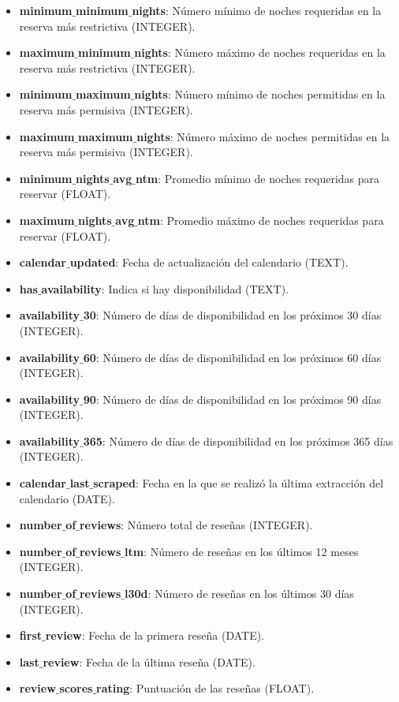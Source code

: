 \begin{itemize}[topsep=0pt, partopsep=0pt, itemsep=0pt, parsep=0pt]
\item \textbf{minimum$\_$minimum$\_$nights}: Número mínimo de noches requeridas en la reserva más restrictiva (INTEGER).
\item \textbf{maximum$\_$minimum$\_$nights}: Número máximo de noches requeridas en la reserva más restrictiva (INTEGER).
\item \textbf{minimum$\_$maximum$\_$nights}: Número mínimo de noches permitidas en la reserva más permisiva (INTEGER).
\item \textbf{maximum$\_$maximum$\_$nights}: Número máximo de noches permitidas en la reserva más permisiva (INTEGER).
\item \textbf{minimum$\_$nights$\_$avg$\_$ntm}: Promedio mínimo de noches requeridas para reservar (FLOAT).
\item \textbf{maximum$\_$nights$\_$avg$\_$ntm}: Promedio máximo de noches requeridas para reservar (FLOAT).
\item \textbf{calendar$\_$updated}: Fecha de actualización del calendario (TEXT).
\item \textbf{has$\_$availability}: Indica si hay disponibilidad (TEXT).
\item \textbf{availability$\_$30}: Número de días de disponibilidad en los próximos 30 días (INTEGER).
\item \textbf{availability$\_$60}: Número de días de disponibilidad en los próximos 60 días (INTEGER).
\item \textbf{availability$\_$90}: Número de días de disponibilidad en los próximos 90 días (INTEGER).
\item \textbf{availability$\_$365}: Número de días de disponibilidad en los próximos 365 días (INTEGER).
\item \textbf{calendar$\_$last$\_$scraped}: Fecha en la que se realizó la última extracción del calendario (DATE).
\item \textbf{number$\_$of$\_$reviews}: Número total de reseñas (INTEGER).
\item \textbf{number$\_$of$\_$reviews$\_$ltm}: Número de reseñas en los últimos 12 meses (INTEGER).
\item \textbf{number$\_$of$\_$reviews$\_$l30d}: Número de reseñas en los últimos 30 días (INTEGER).
\item \textbf{first$\_$review}: Fecha de la primera reseña (DATE).
\item \textbf{last$\_$review}: Fecha de la última reseña (DATE).
\item \textbf{review$\_$scores$\_$rating}: Puntuación de las reseñas (FLOAT).

\end{itemize}
